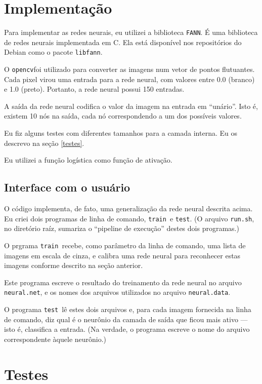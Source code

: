 \documentclass{article}
\newcommand{\FANN}{{\lstinline"FANN"}}
\newcommand{\opencv}{{\lstinline"opencv"}}
\newcommand{\train}{{\lstinline"train"}}
\newcommand{\test}{{\lstinline"test"}}
\begin{document}
\section{Implementação}

Para implementar as redes neurais, eu utilizei a biblioteca \FANN.
É uma biblioteca de redes neurais implementada em C.
Ela está disponível nos repositórios do Debian como o pacote \lstinline"libfann".

O \opencv foi utilizado para converter as imagens num vetor de pontos flutuantes.
Cada pixel virou uma entrada para a rede neural,
com valores entre 0.0 (branco) e 1.0 (preto).
Portanto, a rede neural possui 150 entradas.

A saída da rede neural codifica o valor da imagem na entrada em ``unário''.
Isto é, existem 10 nós na saída, cada nó correspondendo a um dos possíveis valores.

Eu fiz alguns testes com diferentes tamanhos para a camada interna.
Eu os descrevo na seção \ref{testes}.

Eu utilizei a função logística como função de ativação.

\subsection{Interface com o usuário}

O código implementa, de fato, uma generalização da rede neural descrita acima.
Eu criei dois programas de linha de comando, \train\ e \test.
(O arquivo \lstinline"run.sh", no diretório raíz,
sumariza o ``pipeline de execução'' destes dois programas.)

O prgrama \train\ recebe, como parâmetro da linha de comando,
uma lista de imagens em escala de cinza,
e calibra uma rede neural para reconhecer estas imagens
conforme descrito na seção anterior.

Este programa escreve o resultado do treinamento da rede neural
no arquivo \lstinline"neural.net",
e os nomes dos arquivos utilizados no arquivo \lstinline"neural.data".

O programa \test\ lê estes dois arquivos e,
para cada imagem fornecida na linha de comando,
diz qual é o neurônio da camada de saída que ficou mais ativo
--- isto é, classifica a entrada.
(Na verdade, o programa escreve o nome do arquivo correspondente àquele neurônio.)

\section{Testes \label{testes}}
\end{document}
